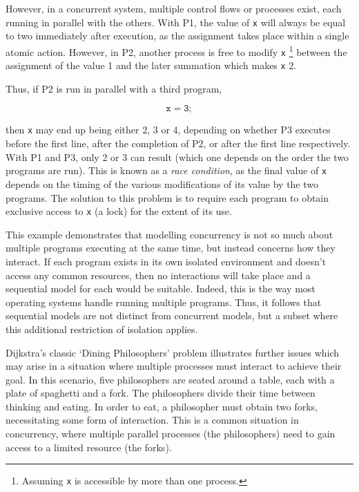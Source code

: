 However, in a concurrent system, multiple control flows or processes
exist, each running in parallel with the others.  With P1, the value
of \texttt{x} will always be equal to two immediately after execution,
as the assignment takes place within a single atomic action.  However,
in P2, another process is free to modify \texttt{x} \footnote{Assuming
  \texttt{x} is accessible by more than one process.} between the
assignment of the value 1 and the later summation which makes
\texttt{x} 2.

Thus, if P2 is run in parallel with a third program,

\begin{equation}
\mathtt{x = 3;} \tag{P3}
\end{equation}

\noindent then \texttt{x} may end up being either 2, 3 or 4, depending
on whether P3 executes before the first line, after the completion of
P2, or after the first line respectively.  With P1 and P3, only 2 or 3
can result (which one depends on the order the two programs are run).
This is known as a \emph{race condition}, as the final value of
\texttt{x} depends on the timing of the various modifications of its
value by the two programs.  The solution to this problem is to require
each program to obtain exclusive access to \texttt{x} (a lock) for the
extent of its use.

This example demonstrates that modelling concurrency is not so much
about multiple programs executing at the same time, but instead
concerns how they interact.  If each program exists in its own
isolated environment and doesn't access any common resources, then no
interactions will take place and a sequential model for each would be
suitable.  Indeed, this is the way most operating systems handle
running multiple programs.  Thus, it follows that sequential models
are not distinct from concurrent models, but a subset where this
additional restriction of isolation applies.

Dijkstra's classic `Dining Philosophers' problem
\cite{dijkstra:philosophers} illustrates further issues which may
arise in a situation where multiple processes must interact to achieve
their goal.  In this scenario, five philosophers are seated around a
table, each with a plate of spaghetti and a fork.  The philosophers
divide their time between thinking and eating.  In order to eat, a
philosopher must obtain two forks, necessitating some form of
interaction.  This is a common situation in concurrency, where
multiple parallel processes (the philosophers) need to gain access to
a limited resource (the forks).

